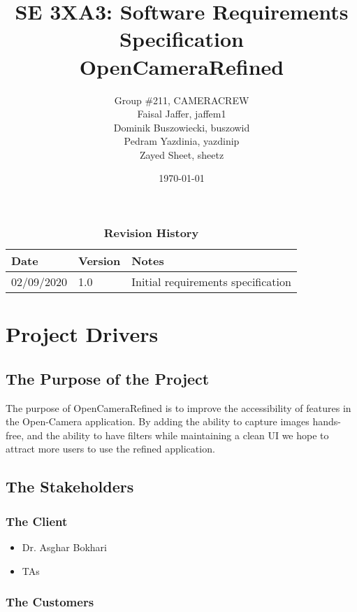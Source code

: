 \documentclass[12pt, titlepage]{article}
\title{SE 3XA3: Software Requirements Specification\\OpenCameraRefined}
\author{Group \#211, CAMERACREW
		\\ Faisal Jaffer, jaffem1
		\\ Dominik Buszowiecki, buszowid
		\\ Pedram Yazdinia, yazdinip
		\\ Zayed Sheet, sheetz
}
\date{\today}
\begin{document}
\maketitle

\tableofcontents
\listoftables
\listoffigures

\begin{table}[bp]
\caption{\bf Revision History}
\begin{tabularx}{\textwidth}{p{3cm}p{2cm}X}
\toprule {\bf Date} & {\bf Version} & {\bf Notes}\\
\midrule
02/09/2020 & 1.0 & Initial requirements specification\\
\bottomrule
\end{tabularx}
\end{table}

\newpage


\section{Project Drivers}

\subsection{The Purpose of the Project}

The purpose of OpenCameraRefined is to improve the accessibility of features in the Open-Camera application. By adding the ability to capture images hands-free, and the ability to have filters while maintaining a clean UI we hope to attract more users to use the refined application.

\subsection{The Stakeholders}

\subsubsection{The Client}

\begin{itemize}
\item Dr. Asghar Bokhari
\item TAs
\end{itemize}

\subsubsection{The Customers}
\end{document}

